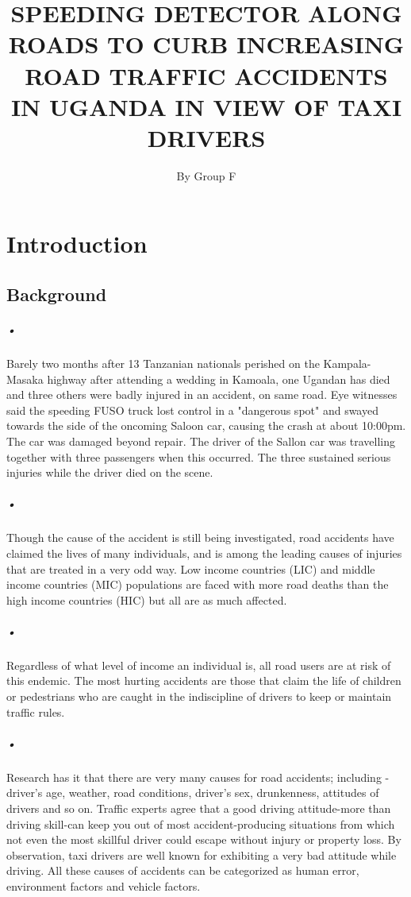 \documentclass[12pt]{report}
\begin{document}
\newpage

\title{SPEEDING DETECTOR ALONG ROADS TO CURB INCREASING ROAD TRAFFIC ACCIDENTS IN UGANDA IN VIEW OF TAXI DRIVERS}
\author{By Group F}      
\renewcommand{\today}{}

\maketitle
\tableofcontents

\chapter{Introduction}
\section{Background}
\paragraph{•}
Barely two months after 13 Tanzanian nationals perished on the Kampala-Masaka highway after attending a wedding in Kamoala, one Ugandan has died and three others were badly injured in an accident, on same road. Eye witnesses said the speeding FUSO truck lost control in a "dangerous spot" and swayed towards the side of the oncoming Saloon car, causing the crash at about 10:00pm. The car was damaged beyond repair. The driver of the Sallon car was travelling together with three passengers when this occurred. The three sustained serious injuries while the driver died on the scene. 
\paragraph{•}
Though the cause of the accident is still being investigated, road accidents have claimed the lives of many individuals, and is among the leading causes of injuries that are treated in a very odd way. Low income countries (LIC) and middle income countries (MIC) populations are faced with more road deaths than the high income countries (HIC) but all are as much affected.
\paragraph{•}
Regardless of what level of income an individual is, all road users are at risk of this endemic. The most hurting accidents are those that claim the life of children or pedestrians who are caught in the indiscipline of drivers to keep or maintain traffic rules. 
\paragraph{•}
Research has it that there are very many causes for road accidents; including - driver's age, weather, road conditions, driver's sex, drunkenness, attitudes of drivers and so on. Traffic experts agree that a good driving attitude-more than driving skill-can keep you out of most accident-producing situations from which not even the most skillful driver could escape without injury or property loss. By observation, taxi drivers are well known for exhibiting a very bad attitude while driving. All these causes of accidents can be categorized as human error, environment factors and vehicle factors. 
\end{document}
